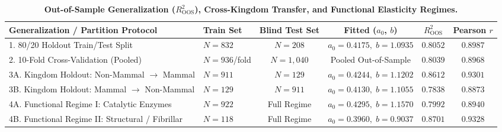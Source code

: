 \documentclass[11pt,onecolumn,letterpaper]{article}
\begin{document}
\begin{table}[h!]
\centering
\caption{\textbf{Out-of-Sample Generalization ($R^2_{\mathrm{OOS}}$), Cross-Kingdom Transfer, and Functional Elasticity Regimes.}}
\vspace{4pt}
\footnotesize
\begin{tabular}{llcccc}
\toprule
\textbf{Generalization / Partition Protocol} & \textbf{Train Set} & \textbf{Blind Test Set} & \textbf{Fitted ($a_0$, $b$)} & \textbf{$R^2_{\mathrm{OOS}}$} & \textbf{Pearson $r$} \\
\midrule
1. 80/20 Holdout Train/Test Split & $N = 832$ & $N = 208$ & $a_0=0.4175,\; b=1.0935$ & $0.8052$ & $0.8987$ \\
2. 10-Fold Cross-Validation (Pooled) & $N = 936$/fold & $N = 1,040$ & Pooled Out-of-Sample & $0.8039$ & $0.8968$ \\
3A. Kingdom Holdout: Non-Mammal $\rightarrow$ Mammal & $N = 911$ & $N = 129$ & $a_0=0.4244,\; b=1.1202$ & $\mathbf{0.8612}$ & $\mathbf{0.9301}$ \\
3B. Kingdom Holdout: Mammal $\rightarrow$ Non-Mammal & $N = 129$ & $N = 911$ & $a_0=0.4130,\; b=1.1055$ & $0.7838$ & $0.8873$ \\
4A. Functional Regime I: Catalytic Enzymes & $N = 922$ & Full Regime & $a_0=0.4295,\; b=1.1570$ & $0.7992$ & $0.8940$ \\
4B. Functional Regime II: Structural / Fibrillar & $N = 118$ & Full Regime & $a_0=0.3960,\; b=0.9037$ & $\mathbf{0.8701}$ & $\mathbf{0.9328}$ \\
\bottomrule
\end{tabular}
\end{table}
\end{document}
